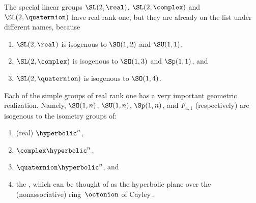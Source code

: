 \begin{rem}
 The special linear groups $\SL(2,\real)$,
$\SL(2,\complex)$ and $\SL(2,\quaternion)$ have real rank
one, but they are already on the list under different names, because
 \begin{enumerate}
 \item $\SL(2,\real)$ is isogenous to $\SO(1,2)$ and
$\SU(1,1)$,
 \item $\SL(2,\complex)$ is isogenous to $\SO(1,3)$ and
$\Sp(1,1)$, and
 \item $\SL(2,\quaternion)$ is isogenous to $\SO(1,4)$.
 \end{enumerate}
 \end{rem}


\begin{rem}
 Each of the simple groups of real rank one has a very important geometric realization. Namely, $\SO(1,n)$, $\SU(1,n)$, $\Sp(1,n)$, and $F_{4,1}$ (respectively) are isogenous to the isometry groups of:
	 \begin{enumerate}

	\item (real)  $\hyperbolic^n$,
	 \item {} $\complex\hyperbolic^n$,
	 \item {} $\quaternion\hyperbolic^n$,
	 and
	 \item the , which can be thought of as the hyperbolic plane over the (nonassociative) ring~$\octonion$ of Cayley .
	 \end{enumerate}
\end{rem}









